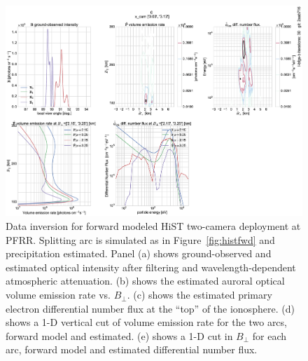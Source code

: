 \begin{figure}\centering
    \includegraphics[width=0.75\columnwidth]{gfx/est0}
    \caption{Data inversion for forward modeled HiST two-camera deployment at PFRR. Splitting arc is simulated as in Figure~\ref{fig:histfwd} and precipitation estimated. Panel (a) shows ground-observed and estimated optical intensity after filtering and wavelength-dependent atmospheric attenuation. (b) shows the estimated auroral optical volume emission rate vs. $B_\perp$. (c) shows the estimated primary electron differential number flux at the ``top'' of the ionosphere. (d) shows a 1-D vertical cut of volume emission rate for the two arcs, forward model and estimated. (e) shows a 1-D cut in $B_\perp$ for each arc, forward model and estimated differential number flux.}\label{fig:histest}
\end{figure}